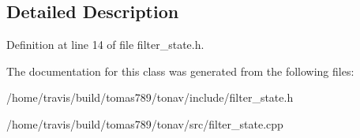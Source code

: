 \subsection{Detailed Description}


Definition at line 14 of file filter\-\_\-state.\-h.



The documentation for this class was generated from the following files\-:\begin{DoxyCompactItemize}
\item 
/home/travis/build/tomas789/tonav/include/filter\-\_\-state.\-h\item 
/home/travis/build/tomas789/tonav/src/filter\-\_\-state.\-cpp\end{DoxyCompactItemize}
